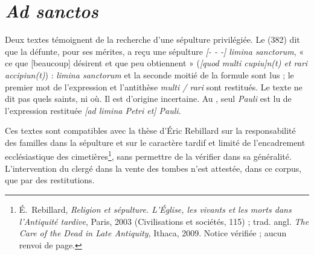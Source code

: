 \section{\emph{Ad sanctos}}

Deux textes témoignent de la recherche d’une sépulture privilégiée. Le  (382) dit que la défunte, pour ses mérites, a reçu une sépulture \emph{[- - -] limina sanctorum}, « ce que [beaucoup] désirent et que peu obtiennent » (\emph{[quod multi cupiu]n(t) et rari accipiun(t)}) : \emph{limina sanctorum} et la seconde moitié de la formule sont lus ; le premier mot de l’expression et l’antithèse \emph{multi / rari} sont restitués. Le texte ne dit pas quels saints, ni où. Il est d’origine incertaine. Au , seul \emph{Pauli} est lu de l’expression restituée \emph{[ad limina Petri et] Pauli}.

Ces textes sont compatibles avec la thèse d’Éric Rebillard sur la responsabilité des familles dans la sépulture et sur le caractère tardif et limité de l’encadrement ecclésiastique des cimetières\footnote{É.~Rebillard, \emph{Religion et sépulture. L’Église, les vivants et les morts dans l’Antiquité tardive}, Paris, 2003 (Civilisations et sociétés, 115) ; trad. angl. \emph{The Care of the Dead in Late Antiquity}, Ithaca, 2009. Notice vérifiée ; aucun renvoi de page.}, sans permettre de la vérifier dans sa généralité. L’intervention du clergé dans la vente des tombes n’est attestée, dans ce corpus, que par des restitutions.
